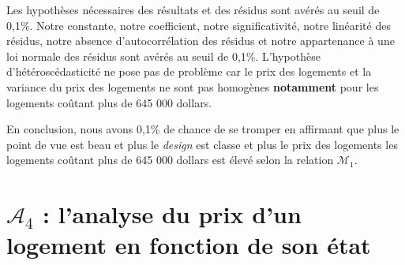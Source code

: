 \documentclass[
  11pt,
  french,
]{article}
\begin{document}
Les hypothèses nécessaires des résultats et des résidus sont avérés au
seuil de 0,1\%. Notre constante, notre coefficient, notre
significativité, notre linéarité des résidus, notre absence
d'autocorrélation des résidus et notre appartenance à une loi normale
des résidus sont avérés au seuil de 0,1\%. L'hypothèse
d'hétéroscédasticité ne pose pas de problème car le prix des logements
et la variance du prix des logements ne sont pas homogènes
\textbf{notamment} pour les logements coûtant plus de 645 000 dollars.

En conclusion, nous avons 0,1\% de chance de se tromper en affirmant que
plus le point de vue est beau et plus le \textit{design} est classe et
plus le prix des logements les logements coûtant plus de 645 000 dollars
est élevé selon la relation \(\mathcal{M}_{1}\).

\newpage

\hypertarget{mathcala_4-lanalyse-du-prix-dun-logement-en-fonction-de-son-uxe9tat}{%
\section{\texorpdfstring{\(\mathcal{A}_{4}\) : l'analyse du prix d'un
logement en fonction de son
état}{\textbackslash mathcal\{A\}\_\{4\} : l'analyse du prix d'un logement en fonction de son état}}\label{mathcala_4-lanalyse-du-prix-dun-logement-en-fonction-de-son-uxe9tat}}
\end{document}
